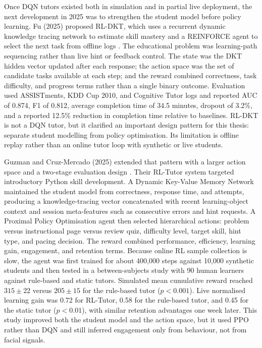 Once DQN tutors existed both in simulation and in partial live deployment, the next development in 2025 was to strengthen the student model before policy learning. Fu (2025) proposed RL-DKT, which uses a recurrent dynamic knowledge tracing network to estimate skill mastery and a REINFORCE agent to select the next task from offline logs \cite{fu_integrating_2025}. The educational problem was learning-path sequencing rather than live hint or feedback control. The state was the DKT hidden vector updated after each response; the action space was the set of candidate tasks available at each step; and the reward combined correctness, task difficulty, and progress terms rather than a single binary outcome. Evaluation used ASSISTments, KDD Cup 2010, and Cognitive Tutor logs and reported AUC of 0.874, F1 of 0.812, average completion time of 34.5 minutes, dropout of 3.2\%, and a reported 12.5\% reduction in completion time relative to baselines. RL-DKT is not a DQN tutor, but it clarified an important design pattern for this thesis: separate student modelling from policy optimisation. Its limitation is offline replay rather than an online tutor loop with synthetic or live students.

Guzman and Cruz-Mercado (2025) extended that pattern with a larger action space and a two-stage evaluation design \cite{guzman_developing_2025}. Their RL-Tutor system targeted introductory Python skill development. A Dynamic Key-Value Memory Network maintained the student model from correctness, response time, and attempts, producing a knowledge-tracing vector concatenated with recent learning-object context and session meta-features such as consecutive errors and hint requests. A Proximal Policy Optimisation agent then selected hierarchical actions: problem versus instructional page versus review quiz, difficulty level, target skill, hint type, and pacing decision. The reward combined performance, efficiency, learning gain, engagement, and retention terms. Because online RL sample collection is slow, the agent was first trained for about 400{,}000 steps against 10{,}000 synthetic students and then tested in a between-subjects study with 90 human learners against rule-based and static tutors. Simulated mean cumulative reward reached $315 \pm 22$ versus $205 \pm 15$ for the rule-based tutor ($p<0.001$). Live normalised learning gain was 0.72 for RL-Tutor, 0.58 for the rule-based tutor, and 0.45 for the static tutor ($p<0.01$), with similar retention advantages one week later. This study improved both the student model and the action space, but it used PPO rather than DQN and still inferred engagement only from behaviour, not from facial signals.

